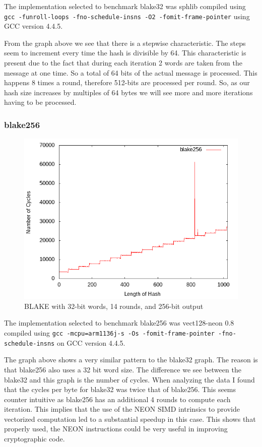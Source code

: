 \documentclass[10pt,a4paper]{article}
\begin{document}
The implementation selected to benchmark blake32 was sphlib compiled using
\texttt{gcc -funroll-loops -fno-schedule-insns -O2 -fomit-frame-pointer} using
GCC version 4.4.5.

From the graph above we see that there is a stepwise characteristic. The steps seem to increment every time the hash is divisible by 64. 
This characteristic is present due to the fact that during each iteration 2 words are taken from the message at one time. So a total of 64 bits
of the actual message is processed. This happens 8 times a round, therefore 512-bits are processed per round. So, as our hash size increases by 
multiples of 64 bytes we will see more and more iterations having to be processed.

\subsubsection{blake256}
    \begin{figure}[H]
        \begin{center}
            \includegraphics[scale=0.5]{images_fast_run/blake256.png} 
            \caption{BLAKE with 32-bit words, 14 rounds, and 256-bit output}
        \end{center}
    \end{figure}

The implementation selected to benchmark blake256 was vect128-neon 0.8 compiled
using \texttt{gcc -mcpu=arm1136j-s -Os -fomit-frame-pointer -fno-schedule-insns}
on GCC version 4.4.5.

The graph above shows a very similar pattern to the blake32 graph. The reason is
that blake256 also uses a 32 bit word size. The difference we see between the
blake32 and this graph is the number of cycles. When analyzing the data I found
that the cycles per byte for blake32 was twice that of blake256. This seems
counter intuitive as blake256 has an additional 4 rounds to compute each
iteration. This implies that the use of the NEON SIMD intrinsics to provide
vectorized computation led to a substantial speedup in this case. This shows
that properly used, the NEON instructions could be very useful in improving
cryptographic code.
\end{document}
